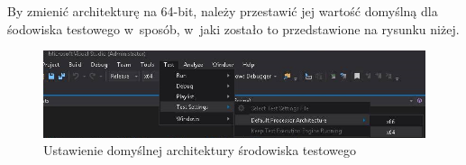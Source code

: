By zmienić architekturę na 64-bit, należy przestawić jej wartość domyślną dla śodowiska testowego w~sposób, w~jaki zostało to przedstawione na rysunku niżej.

\begin{figure}[H]
	\includegraphics[width=15cm]{img/UnitTests_x64_architecture.png}
	\caption{Ustawienie domyślnej architektury środowiska testowego}
\end{figure}
